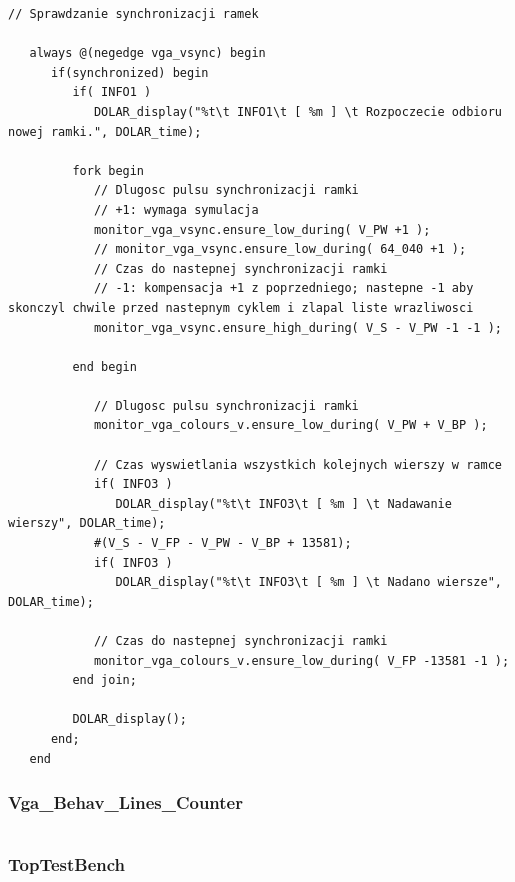 \documentclass[a4paper,12pt]{article}
\begin{document}
\begin{lstlisting}[label=Syncvga,caption=Sync.v,firstnumber=56]
   // Sprawdzanie synchronizacji ramek

   always @(negedge vga_vsync) begin
      if(synchronized) begin
         if( INFO1 )
            DOLAR_display("%t\t INFO1\t [ %m ] \t Rozpoczecie odbioru nowej ramki.", DOLAR_time);

         fork begin
            // Dlugosc pulsu synchronizacji ramki
            // +1: wymaga symulacja
            monitor_vga_vsync.ensure_low_during( V_PW +1 );
            // monitor_vga_vsync.ensure_low_during( 64_040 +1 );
            // Czas do nastepnej synchronizacji ramki
            // -1: kompensacja +1 z poprzedniego; nastepne -1 aby skonczyl chwile przed nastepnym cyklem i zlapal liste wrazliwosci
            monitor_vga_vsync.ensure_high_during( V_S - V_PW -1 -1 );

         end begin

            // Dlugosc pulsu synchronizacji ramki
            monitor_vga_colours_v.ensure_low_during( V_PW + V_BP );

            // Czas wyswietlania wszystkich kolejnych wierszy w ramce
            if( INFO3 )
               DOLAR_display("%t\t INFO3\t [ %m ] \t Nadawanie wierszy", DOLAR_time);
            #(V_S - V_FP - V_PW - V_BP + 13581);
            if( INFO3 )
               DOLAR_display("%t\t INFO3\t [ %m ] \t Nadano wiersze", DOLAR_time);

            // Czas do nastepnej synchronizacji ramki
            monitor_vga_colours_v.ensure_low_during( V_FP -13581 -1 );
         end join;

         DOLAR_display();
      end;
   end
\end{lstlisting}




\subsubsection{Vga\_Behav\_Lines\_Counter}

\begin{lstlisting}[label=Syncvga,caption=Sync.v,firstnumber=56]

\end{lstlisting}


\subsubsection{TopTestBench}
\end{document}
